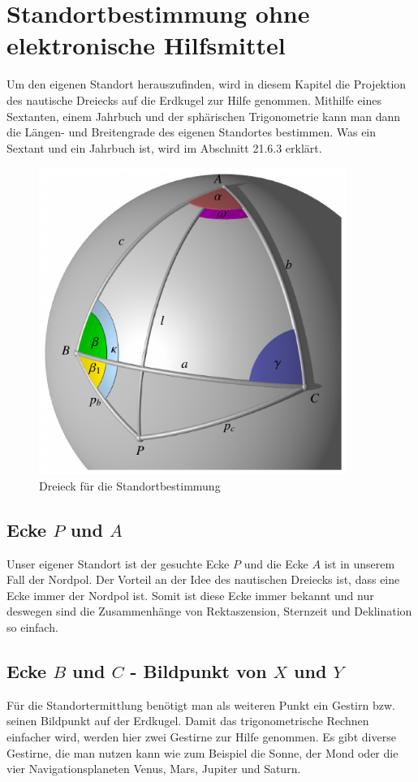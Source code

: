 \section{Standortbestimmung ohne elektronische Hilfsmittel}
Um den eigenen Standort herauszufinden, wird in diesem Kapitel die Projektion des nautische Dreiecks auf die Erdkugel zur Hilfe genommen. 
Mithilfe eines Sextanten, einem Jahrbuch und der sphärischen Trigonometrie kann man dann die Längen- und Breitengrade des eigenen Standortes bestimmen.
Was ein Sextant und ein Jahrbuch ist, wird im Abschnitt 21.6.3 erklärt.
\begin{figure}
	\begin{center}
		\includegraphics[width=10cm]{papers/nav/bilder/dreieck.pdf}
		\caption[Dreieck für die Standortbestimmung]{Dreieck für die Standortbestimmung}
	\end{center}
\end{figure}




\subsection{Ecke $P$ und $A$}
Unser eigener Standort ist der gesuchte Ecke $P$ und die Ecke $A$ ist in unserem Fall der Nordpol.
Der Vorteil an der Idee des nautischen Dreiecks ist, dass eine Ecke immer der Nordpol ist. 
Somit ist diese Ecke immer bekannt und nur deswegen sind die Zusammenhänge von Rektaszension, Sternzeit und Deklination so einfach.

\subsection{Ecke $B$ und $C$ - Bildpunkt von $X$ und $Y$}
Für die Standortermittlung benötigt man als weiteren Punkt ein Gestirn bzw. seinen Bildpunkt auf der Erdkugel. 
Damit das trigonometrische Rechnen einfacher wird, werden hier zwei Gestirne zur Hilfe genommen.
Es gibt diverse Gestirne, die man nutzen kann wie zum Beispiel die Sonne, der Mond oder die vier Navigationsplaneten Venus, Mars, Jupiter und Saturn.

